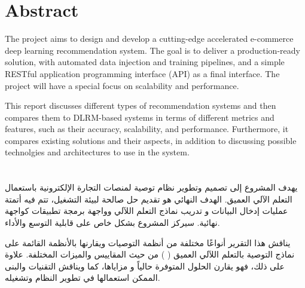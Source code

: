 \cleardoublepage {} {} \mtcaddchapter
\chapter*{Abstract}
The project aims to design and develop a cutting-edge accelerated e-commerce deep learning recommendation system. The goal is to deliver a production-ready solution, with automated data injection and training pipelines, and a simple RESTful application programming interface (API) as a final interface. The project will have a special focus on scalability and performance.

This report discusses different types of recommendation systems and then compares them to DLRM-based systems in terms of different metrics and features, such as their accuracy, scalability, and performance.
Furthermore, it compares existing solutions and their aspects, in addition to discussing possible technolgies and architectures to use in the system.
\cleardoublepage {} {} \mtcaddchapter
\chapter*{}
\begin{RLtext}
يهدف المشروع إلى تصميم وتطوير نظام توصية لمنصات التجارة الإلكترونية باستعمال التعلم الآلي العميق. الهدف النهائي هو تقديم حل صالحة لبيئة التشغيل، تتم فيه أتمتة عمليات إدخال البيانات و تدريب نماذج التعلم اللآلي وواجهة برمجة تطبيقات 
 كواجهة نهائية. سيركز المشروع بشكل خاص على قابلية التوسع والأداء.

يناقش هذا التقرير أنواعًا مختلفة من أنظمة التوصيات ويقارنها بالأنظمة القائمة على نماذج التوصية بالتعلم اللآلي العميق (
    ) من حيث المقاييس والميزات المختلفة. علاوة على ذلك، فهو يقارن الحلول المتوفرة حالياً و مزاياها، كما ويناقش التقنيات والبنى الممكن استعمالها في تطوير النظام وتشغيله.
\end{RLtext}

\justifying